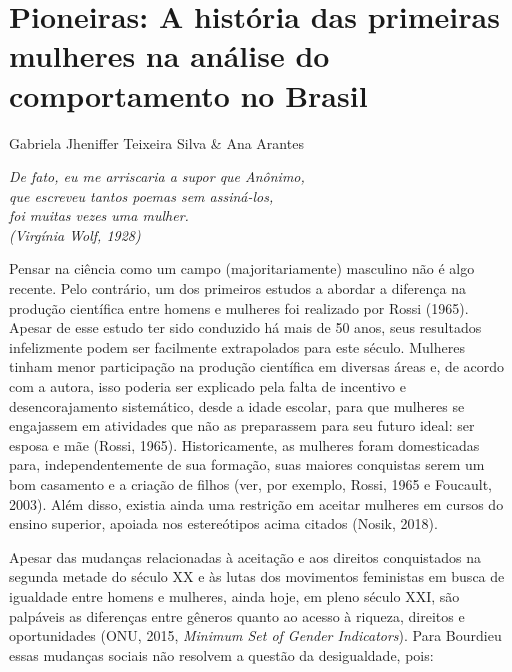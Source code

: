 \chapter{Pioneiras: A história das primeiras mulheres na análise do comportamento no Brasil}
\begin{flushright}
\begin{scriptsize}
Gabriela Jheniffer Teixeira Silva \& Ana Arantes
\end{scriptsize}
\vspace{1cm}

\emph{De fato, eu me arriscaria a supor que Anônimo,\\
que escreveu tantos poemas sem assiná-los,\\
foi muitas vezes uma mulher.\\
(Virgínia Wolf, 1928)}
\end{flushright}

Pensar na ciência como um campo (majoritariamente) masculino não é algo recente. Pelo contrário, um dos primeiros estudos a abordar a diferença na produção científica entre homens e mulheres foi realizado por Rossi (1965). Apesar de esse estudo ter sido conduzido há mais de 50 anos, seus resultados infelizmente podem ser facilmente extrapolados para este século. Mulheres tinham menor participação na produção científica em diversas áreas e, de acordo com a autora, isso poderia ser explicado pela falta de incentivo e desencorajamento sistemático, desde a idade escolar, para que mulheres se engajassem em atividades que não as preparassem para seu futuro ideal: ser esposa e mãe (Rossi, 1965). Historicamente, as mulheres foram domesticadas para, independentemente de sua formação, suas maiores conquistas serem um bom casamento e a criação de filhos (ver, por exemplo, Rossi, 1965 e Foucault, 2003). Além disso, existia ainda uma restrição em aceitar mulheres em cursos do ensino superior, apoiada nos estereótipos acima citados (Nosik, 2018).

Apesar das mudanças relacionadas à aceitação e aos direitos conquistados na segunda metade do século XX e às lutas dos movimentos feministas em busca de igualdade entre homens e mulheres, ainda hoje, em pleno século XXI, são palpáveis as diferenças entre gêneros quanto ao acesso à riqueza, direitos e oportunidades (ONU, 2015, \textit{Minimum Set of Gender Indicators}). Para Bourdieu essas mudanças sociais não resolvem a questão da desigualdade, pois:

